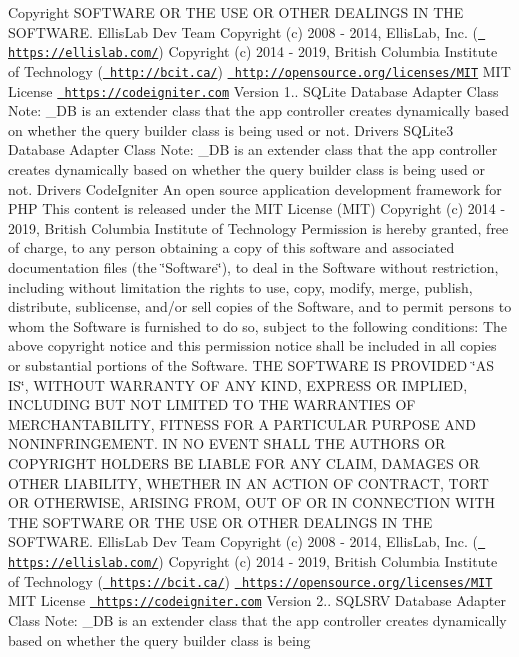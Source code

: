 \begin{DoxyCopyright}{Copyright}
S\+O\+F\+T\+W\+A\+RE OR T\+HE U\+SE OR O\+T\+H\+ER D\+E\+A\+L\+I\+N\+GS IN T\+HE S\+O\+F\+T\+W\+A\+RE.  Ellis\+Lab Dev Team  Copyright (c) 2008 -\/ 2014, Ellis\+Lab, Inc. (\href{https://ellislab.com/}{\texttt{ https\+://ellislab.\+com/}})  Copyright (c) 2014 -\/ 2019, British Columbia Institute of Technology (\href{http://bcit.ca/}{\texttt{ http\+://bcit.\+ca/}})  \href{http://opensource.org/licenses/MIT}{\texttt{ http\+://opensource.\+org/licenses/\+M\+IT}} M\+IT License  \href{https://codeigniter.com}{\texttt{ https\+://codeigniter.\+com}}  Version 1..  S\+Q\+Lite Database Adapter Class Note\+: \+\_\+\+DB is an extender class that the app controller creates dynamically based on whether the query builder class is being used or not.  Drivers S\+Q\+Lite3 Database Adapter Class Note\+: \+\_\+\+DB is an extender class that the app controller creates dynamically based on whether the query builder class is being used or not.  Drivers Code\+Igniter An open source application development framework for P\+HP This content is released under the M\+IT License (M\+IT) Copyright (c) 2014 -\/ 2019, British Columbia Institute of Technology Permission is hereby granted, free of charge, to any person obtaining a copy of this software and associated documentation files (the \char`\"{}\+Software\char`\"{}), to deal in the Software without restriction, including without limitation the rights to use, copy, modify, merge, publish, distribute, sublicense, and/or sell copies of the Software, and to permit persons to whom the Software is furnished to do so, subject to the following conditions\+: The above copyright notice and this permission notice shall be included in all copies or substantial portions of the Software. T\+HE S\+O\+F\+T\+W\+A\+RE IS P\+R\+O\+V\+I\+D\+ED \char`\"{}\+A\+S I\+S\char`\"{}, W\+I\+T\+H\+O\+UT W\+A\+R\+R\+A\+N\+TY OF A\+NY K\+I\+ND, E\+X\+P\+R\+E\+SS OR I\+M\+P\+L\+I\+ED, I\+N\+C\+L\+U\+D\+I\+NG B\+UT N\+OT L\+I\+M\+I\+T\+ED TO T\+HE W\+A\+R\+R\+A\+N\+T\+I\+ES OF M\+E\+R\+C\+H\+A\+N\+T\+A\+B\+I\+L\+I\+TY, F\+I\+T\+N\+E\+SS F\+OR A P\+A\+R\+T\+I\+C\+U\+L\+AR P\+U\+R\+P\+O\+SE A\+ND N\+O\+N\+I\+N\+F\+R\+I\+N\+G\+E\+M\+E\+NT. IN NO E\+V\+E\+NT S\+H\+A\+LL T\+HE A\+U\+T\+H\+O\+RS OR C\+O\+P\+Y\+R\+I\+G\+HT H\+O\+L\+D\+E\+RS BE L\+I\+A\+B\+LE F\+OR A\+NY C\+L\+A\+IM, D\+A\+M\+A\+G\+ES OR O\+T\+H\+ER L\+I\+A\+B\+I\+L\+I\+TY, W\+H\+E\+T\+H\+ER IN AN A\+C\+T\+I\+ON OF C\+O\+N\+T\+R\+A\+CT, T\+O\+RT OR O\+T\+H\+E\+R\+W\+I\+SE, A\+R\+I\+S\+I\+NG F\+R\+OM, O\+UT OF OR IN C\+O\+N\+N\+E\+C\+T\+I\+ON W\+I\+TH T\+HE S\+O\+F\+T\+W\+A\+RE OR T\+HE U\+SE OR O\+T\+H\+ER D\+E\+A\+L\+I\+N\+GS IN T\+HE S\+O\+F\+T\+W\+A\+RE.  Ellis\+Lab Dev Team  Copyright (c) 2008 -\/ 2014, Ellis\+Lab, Inc. (\href{https://ellislab.com/}{\texttt{ https\+://ellislab.\+com/}})  Copyright (c) 2014 -\/ 2019, British Columbia Institute of Technology (\href{https://bcit.ca/}{\texttt{ https\+://bcit.\+ca/}})  \href{https://opensource.org/licenses/MIT}{\texttt{ https\+://opensource.\+org/licenses/\+M\+IT}} M\+IT License  \href{https://codeigniter.com}{\texttt{ https\+://codeigniter.\+com}}  Version 2..  S\+Q\+L\+S\+RV Database Adapter Class Note\+: \+\_\+\+DB is an extender class that the app controller creates dynamically based on whether the query builder class is being 
\end{DoxyCopyright}
